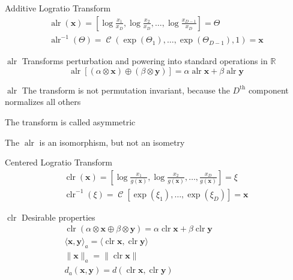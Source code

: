 \documentclass[dark]{cgem-presentation}
\DeclareMathOperator{\closure}{\operatorname{\mathcal{C}}}
\DeclareMathOperator{\alr}{\operatorname{alr}}
\DeclareMathOperator{\clr}{\operatorname{clr}}
\begin{document}
\begin{frame}{Additive Logratio Transform}
	\LARGE
	\begin{gather*}
		\alr(\mathbf{x}) = \left[ \log \frac{x_1}{x_D},
		\log \frac{x_2}{x_D}, \ldots , \log \frac{x_{D-1}}{x_D}
		\right] = \Theta \\[4mm]
		\alr^{-1}(\Theta) = \closure(\exp(\Theta_1), \ldots ,
		\exp(\Theta_{D-1}), 1) = \mathbf{x}
	\end{gather*}
\end{frame}

\begin{frame}{$\alr$}
	\LARGE
	Transforms perturbation and powering into standard operations
	in $\mathbb{R}$
	\begin{equation*}
		\alr[(\alpha \otimes \mathbf{x}) \oplus (\beta \otimes
		\mathbf{y})] = \alpha \alr \mathbf{x} + \beta \alr \mathbf{y}
	\end{equation*}
\end{frame}

\begin{frame}{$\alr$}
	\LARGE
	The transform is not permutation invariant, because the
	$D^\text{th}$ component normalizes all others

	\vspace{4mm}
	The transform is called \textcolor{ThirdColor}{asymmetric}

	\vspace{4mm}
	The $\alr$ is an isomorphism, but not an isometry 
\end{frame}

\begin{frame}{Centered Logratio Transform}
	\LARGE
	\begin{gather*}
		\clr(\mathbf{x}) = \left[ \log \frac{x_1}{g(\mathbf{x})},
		\log \frac{x_2}{g(\mathbf{x})}, \ldots , \frac{x_D}
		{g(\mathbf{x})} \right] = \xi \\[4mm]
		\clr^{-1}(\xi) = \closure[ \exp(\xi_1), \ldots ,
		\exp(\xi_D)] = \mathbf{x}
	\end{gather*}
\end{frame}

\begin{frame}{$\clr$}
	\LARGE
	Desirable properties
	\begin{align*}
		&\clr(\alpha \otimes \mathbf{x} \oplus \beta
		\otimes \mathbf{y}) = \alpha \clr \mathbf{x}
		+ \beta \clr \mathbf{y} \quad \quad \quad \quad \quad \\
		&\langle \mathbf{x}, \mathbf{y} \rangle_a =
		\langle \clr \mathbf{x}, \clr \mathbf{y} \rangle \\
		&\| \mathbf{x} \|_a = \| \clr \mathbf{x} \| \\
		&d_a( \mathbf{x}, \mathbf{y} ) = d(\clr \mathbf{x},
		\clr \mathbf{y} )
	\end{align*}
\end{frame}
\end{document}
